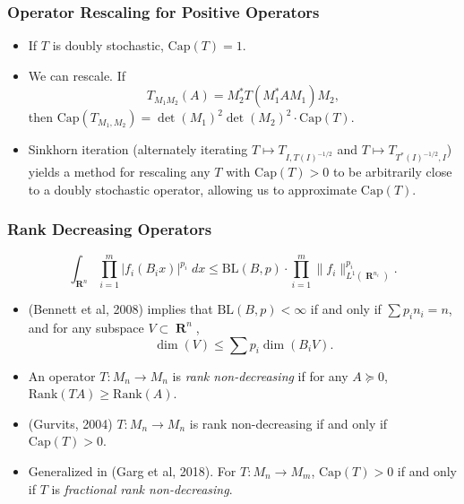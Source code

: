 \documentclass[usenames,dvipsnames,12pt]{beamer}
\DeclareMathOperator{\RR}{\mathbf{R}}
\begin{document}
\begin{frame}
    \frametitle{Operator Rescaling for Positive Operators}

    \begin{itemize}
        \item If $T$ is doubly stochastic, $\text{Cap}(T) = 1$.

        \pause
        \item We can rescale. If
        \[ T_{M_1M_2}(A) = M_2^* T(M_1^* A M_1) M_2, \]
        then $\text{Cap}(T_{M_1,M_2}) = \det(M_1)^2 \det(M_2)^2 \cdot \text{Cap}(T)$.

        \pause
        \item Sinkhorn iteration (alternately iterating $T \mapsto T_{I,T(I)^{-1/2}}$ and $T \mapsto T_{T^*(I)^{-1/2}, I}$) yields a method for rescaling any $T$ with $\text{Cap}(T) > 0$ to be arbitrarily close to a doubly stochastic operator, allowing us to approximate $\text{Cap}(T)$.
    \end{itemize}
\end{frame}

\begin{frame}
    \frametitle{Rank Decreasing Operators}

    \[ \int_{\RR^n} \prod_{i = 1}^m |f_i(B_i x)|^{p_i}\; dx \leq \text{BL}(B,p) \cdot \prod_{i=1}^m \| f_i \|_{L^1(\RR^{n_i})}^{p_i}.  \]

    \begin{itemize}
        \pause
        \item (Bennett et al, 2008) implies that $\text{BL}(B,p) < \infty$ if and only if $\sum p_i n_i = n$, and for any subspace $V \subset \RR^n$,
        \[ \dim(V) \leq \sum p_i \dim(B_i V). \]

        \pause
        \item An operator $T: M_n \to M_n$ is \emph{rank non-decreasing} if for any $A \succeq 0$, $\text{Rank}(TA) \geq \text{Rank}(A)$.

        \pause
        \item (Gurvits, 2004) $T: M_n \to M_n$ is rank non-decreasing if and only if $\text{Cap}(T) > 0$.

        \pause
        \item Generalized in (Garg et al, 2018). For $T: M_n \to M_m$, $\text{Cap}(T) > 0$ if and only if $T$ is \emph{fractional rank non-decreasing}.
    \end{itemize}
\end{frame}
\end{document}
